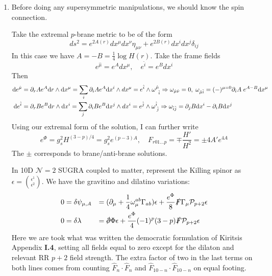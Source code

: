 \documentclass[11pt, class=article, crop=false]{standalone}
\begin{document}
\begin{enumerate}
	\item Before doing any supersymmetric manipulations, we should know the spin connection.
	
	Take the extremal $p$-brane metric to be of the form
	\[
		ds^2 = e^{2 A(r)} dx^\mu dx^\nu \eta_{\mu \nu} + e^{2 B(r)} dx^i dx^j \delta_{ij}
	\]
	In this case we have $A = - B = \frac14 \log H(r)$. Take the frame fields
	\[
		e^{\hat \mu} = e^A dx^\mu, \quad e^{\hat i} = e^B dx^{i}
	\]
	Then
	\[
		\begin{aligned}
			\mathrm{d} e^{\hat \mu} &= \partial_r A e^{A} \mathrm{d} r \wedge \mathrm{d} x^\mu = \sum_i \partial_i A e^A \mathrm{d} x^i \wedge dx^\mu = e^{\hat i} \wedge \omega^{\hat \mu}_{\;\; \hat i} \Rightarrow  \omega_{\hat \mu \hat \nu} = 0, \; \omega_{\hat \mu \hat i} = (-)^{\mu=0} \partial_i A \; e^{A - B} \mathrm{d} x^\mu \\
			\mathrm{d} e^{\hat i} &= \partial_r B e^{B} \mathrm{d} r \wedge \mathrm{d} x^i = \sum_j \partial_i B e^B \mathrm{d} x^j \wedge dx^i = e^{\hat j} \wedge \omega^{\hat i}_{\; \hat j}
			\Rightarrow \omega_{\hat i \hat j} = \partial_j B \mathrm{d} x^i - \partial_i B \mathrm{d} x^j \\
		\end{aligned}
	\]
	Using our extremal form of the solution, I can further write
	\[
		e^{\Phi} = g_s^2 H^{(3-p)/4} = g_s^2 e^{(p-3) A}, \quad F_{r01\dots p} = \mp \frac{H'}{H^2} = \pm 4 A' e^{4A}
	\]
	The $\pm$ corresponds to brane/anti-brane solutions.
%
	
	In 10D $\mathcal N = 2$ SUGRA coupled to matter, represent the Killing spinor as $\epsilon = {\epsilon^1 \choose \epsilon^2}$. We have the gravitino and dilatino variations:
	\[
	\begin{aligned}
		0 &=
		 \delta \psi_{\mu, A} & = & \; (\d_\mu + \frac14 \omega_{\mu}^{ab} \Gamma_{ab}) \epsilon + \frac{e^\Phi}{8} \slashed{F} \Gamma_\mu \mathcal P_{p+2} \epsilon \\
		0 &= \delta \lambda & =& \; \slashed{\d} \Phi \epsilon  + \frac{e^{\Phi}}{4} (-1)^p (3-p) \slashed F \mathcal P_{p+2} \epsilon
	\end{aligned}
	\]
	Here we are took what was written the democratic formulation of Kiritsis Appendix \textbf{I.4}, setting all fields equal to zero except for the dilaton and relevant RR $p+2$ field strength. The extra factor of two in the last terms on both lines comes from counting $\hat F_n \cdot \hat F_n$ and $\hat F_{10-n} \cdot \hat F_{10-n}$ on equal footing.
	

\end{enumerate}
\end{document}
